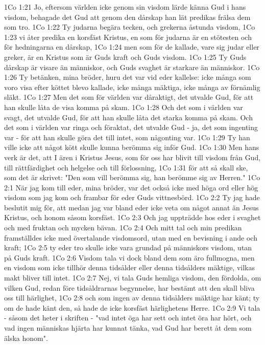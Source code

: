 1Co 1:21  Jo, eftersom världen icke genom sin visdom lärde känna Gud i hans visdom, behagade det Gud att genom den dårskap han lät predikas frälsa dem som tro.
1Co 1:22  Ty judarna begära tecken, och grekerna åstunda visdom,
1Co 1:23  vi åter predika en korsfäst Kristus, en som för judarna är en stötesten och för hedningarna en dårskap,
1Co 1:24  men som för de kallade, vare sig judar eller greker, är en Kristus som är Guds kraft och Guds visdom.
1Co 1:25  Ty Guds dårskap är visare än människor, och Guds svaghet är starkare än människor.
1Co 1:26  Ty betänken, mina bröder, huru det var vid eder kallelse: icke många som voro visa efter köttet blevo kallade, icke många mäktiga, icke många av förnämlig släkt.
1Co 1:27  Men det som för världen var dåraktigt, det utvalde Gud, för att han skulle låta de visa komma på skam.
1Co 1:28  Och det som i världen var svagt, det utvalde Gud, för att han skulle låta det starka komma på skam. Och det som i världen var ringa och föraktat, det utvalde Gud - ja, det som ingenting var - för att han skulle göra det till intet, som någonting var.
1Co 1:29  Ty han ville icke att något kött skulle kunna berömma sig inför Gud.
1Co 1:30  Men hans verk är det, att I ären i Kristus Jesus, som för oss har blivit till visdom från Gud, till rättfärdighet och helgelse och till förlossning,
1Co 1:31  för att så skall ske, som det är skrivet: "Den som vill berömma sig, han berömme sig av Herren."
1Co 2:1  När jag kom till eder, mina bröder, var det också icke med höga ord eller hög visdom som jag kom och frambar för eder Guds vittnesbörd.
1Co 2:2  Ty jag hade beslutit mig för, att medan jag var bland eder icke veta om något annat än Jesus Kristus, och honom såsom korsfäst.
1Co 2:3  Och jag uppträdde hos eder i svaghet och med fruktan och mycken bävan.
1Co 2:4  Och mitt tal och min predikan framställdes icke med övertalande visdomsord, utan med en bevisning i ande och kraft;
1Co 2:5  ty eder tro skulle icke vara grundad på människors visdom, utan på Guds kraft.
1Co 2:6  Visdom tala vi dock bland dem som äro fullmogna, men en visdom som icke tillhör denna tidsålder eller denna tidsålders mäktige, vilkas makt bliver till intet.
1Co 2:7  Nej, vi tala Guds hemliga visdom, den fördolda, om vilken Gud, redan före tidsåldrarnas begynnelse, har bestämt att den skall bliva oss till härlighet,
1Co 2:8  och som ingen av denna tidsålders mäktige har känt; ty om de hade känt den, så hade de icke korsfäst härlighetens Herre.
1Co 2:9  Vi tala - såsom det heter i skriften - "vad intet öga har sett och intet öra har hört, och vad ingen människas hjärta har kunnat tänka, vad Gud har berett åt dem som älska honom".
